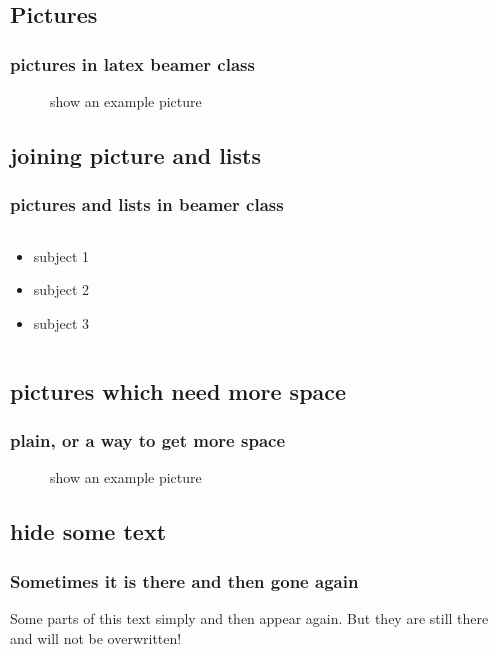\documentclass[hyperref={pdfpagelabels=false}]{beamer}
\begin{document}
\subsection{Pictures} 
\begin{frame}
\frametitle{pictures in latex beamer class}
\begin{figure}
\caption{show an example picture}
\end{figure}
\end{frame}

\subsection{joining picture and lists} 

\begin{frame}
\frametitle{pictures and lists in beamer class}
\begin{columns}
\begin{column}{5cm}
\begin{itemize}
\item<1-> subject 1
\item<3-> subject 2
\item<5-> subject 3
\end{itemize}
\vspace{3cm} 
\end{column}
\begin{column}{5cm}
\begin{overprint}
\end{overprint}
\end{column}
\end{columns}
\end{frame}

\subsection{pictures which need more space} 
\begin{frame}[plain]
\frametitle{plain, or a way to get more space}
\begin{figure}
\caption{show an example picture}
\end{figure}
\end{frame}

\subsection{hide some text}
\begin{frame}
\frametitle{Sometimes it is there and then gone again}
Some parts of this text simply  \pause
and then appear again.  \pause But they are still there and will not be overwritten!
\end{frame}
\end{document}
